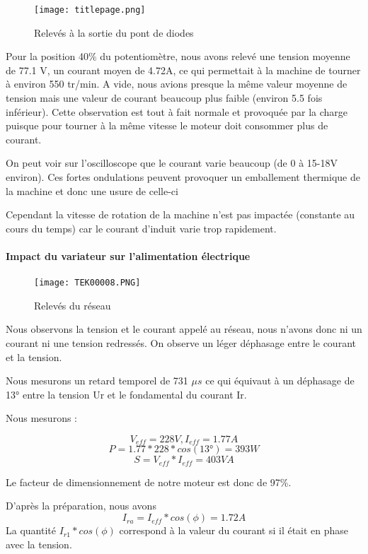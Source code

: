 \documentclass[oneside,a4paper,12pt]{article}
\begin{document}
	\begin{figure}[h]
		\centering
		\texttt{[image: titlepage.png]}
		\caption{Relevés à la sortie du pont de diodes}
	\end{figure}

	Pour la position 40\% du potentiomètre, nous avons relevé une tension moyenne de 77.1 V, un courant moyen de 4.72A, ce qui permettait à la machine de tourner à environ 550 tr/min. 
	A vide, nous avions presque la même valeur moyenne de tension mais une valeur de courant beaucoup plus faible (environ 5.5 fois inférieur). Cette observation est tout à fait normale et provoquée par la charge puisque pour tourner à la même vitesse le moteur doit consommer plus de courant.

	On peut voir sur l’oscilloscope que le courant varie beaucoup (de 0 à 15-18V environ). Ces fortes ondulations peuvent provoquer un emballement thermique de la machine et donc une usure de celle-ci

	Cependant la vitesse de rotation de la machine n’est pas impactée (constante au cours du temps) car le courant d’induit varie trop rapidement.
	
	\paragraph{Impact du variateur sur l'alimentation électrique}
	\paragraph{}
	
	\begin{figure}[h]
		\centering
		\texttt{[image: TEK00008.PNG]}
		\caption{Relevés du réseau}
	\end{figure}

	Nous observons la tension et le courant appelé au réseau, nous n'avons donc ni un courant ni une tension redressés. On observe un léger déphasage entre le courant et la tension.

	Nous mesurons un retard temporel de 731 $\mu s$ ce qui équivaut à un déphasage de 13° entre la tension Ur et le fondamental du courant Ir.

	Nous mesurons :

	$$ V_{eff}=228V, I_{eff}=1.77A $$
	$$ P=1.77*228*cos(13°)=393W $$
	$$ S=V_{eff}*I_{eff}=403VA $$
	
	Le facteur de dimensionnement de notre moteur est donc de 97\%.
	
	D’après la préparation, nous avons $$I_{ra}= I_{eff}*cos(\phi)=1.72 A$$
	La quantité $I_{r1}*cos(\phi)$ correspond à la valeur du courant si il était en phase avec la tension.
	
\end{document}
